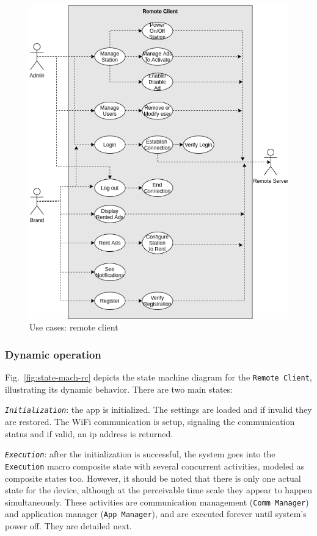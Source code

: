 \begin{figure}[htb!]
\centering
    \includegraphics[width=0.6\columnwidth]{./img/use-cases-rc.png}
  \caption{Use cases: remote client}%
\label{fig:use-cases-rc}
\end{figure}


\subsubsection{Dynamic operation}
\label{sec:dyn-oper-1}

Fig.~\ref{fig:state-mach-rc} depicts the state machine diagram for the
\texttt{Remote Client}, illustrating its dynamic behavior. There are two main
states:
\begin{item-c}
\item \emph{\texttt{Initialization}}: the app is initialized. The settings are loaded and if invalid they are restored. The WiFi communication is setup, signaling the communication status and if valid, an \gls{ip} address is returned.
\item \emph{\texttt{Execution}}: after the initialization is successful, the system goes into the \texttt{Execution} macro composite state with several concurrent activities, modeled as composite states too. However, it should be noted that there is only one actual state for the device, although at the perceivable time scale they appear to happen simultaneously. These activities are communication management (\texttt{Comm Manager}) and application manager (\texttt{App Manager}), and are executed forever until system's power off. They are detailed next.
\end{item-c}

